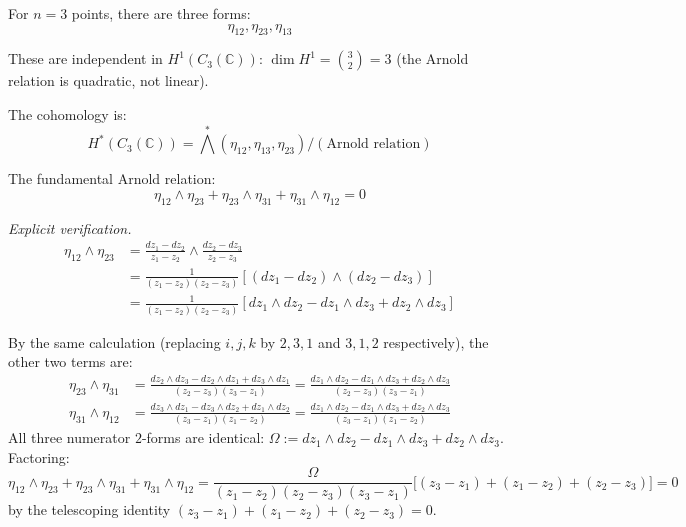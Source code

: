 \begin{example}[\texorpdfstring{$n=3$}{n=3}: the fundamental relation]
\label{ex:arnold-n3-complete}

For $n=3$ points, there are three forms:
\begin{equation}
\eta_{12}, \eta_{23}, \eta_{13}
\end{equation}

These are independent in $H^1(C_3(\mathbb{C}))$: $\dim H^1 = \binom{3}{2} = 3$
(the Arnold relation is quadratic, not linear).

The cohomology is:
\begin{equation}
H^*(C_3(\mathbb{C})) = \bigwedge^*(\eta_{12}, \eta_{13}, \eta_{23}) / (\text{Arnold relation})
\end{equation}

The fundamental Arnold relation:
\begin{equation}
\eta_{12} \wedge \eta_{23} + \eta_{23} \wedge \eta_{31} + \eta_{31}
\wedge \eta_{12} = 0
\end{equation}

\emph{Explicit verification.}
\begin{align}
\eta_{12} \wedge \eta_{23} &= \frac{dz_1 - dz_2}{z_1 - z_2} \wedge \frac{dz_2 -
dz_3}{z_2 - z_3}\\
&= \frac{1}{(z_1-z_2)(z_2-z_3)} [(dz_1 - dz_2) \wedge (dz_2 - dz_3)]\\
&= \frac{1}{(z_1-z_2)(z_2-z_3)} [dz_1 \wedge dz_2 - dz_1 \wedge dz_3 + dz_2 \wedge dz_3]
\end{align}

By the same calculation (replacing $i,j,k$ by $2,3,1$ and $3,1,2$ respectively), the other two terms are:
\begin{align}
\eta_{23} \wedge \eta_{31} &= \frac{dz_2 \wedge dz_3 - dz_2 \wedge dz_1 + dz_3 \wedge dz_1}{(z_2-z_3)(z_3-z_1)} = \frac{dz_1 \wedge dz_2 - dz_1 \wedge dz_3 + dz_2 \wedge dz_3}{(z_2-z_3)(z_3-z_1)}\\
\eta_{31} \wedge \eta_{12} &= \frac{dz_3 \wedge dz_1 - dz_3 \wedge dz_2 + dz_1 \wedge dz_2}{(z_3-z_1)(z_1-z_2)} = \frac{dz_1 \wedge dz_2 - dz_1 \wedge dz_3 + dz_2 \wedge dz_3}{(z_3-z_1)(z_1-z_2)}
\end{align}
All three numerator $2$-forms are identical: $\Omega := dz_1 \wedge dz_2 - dz_1 \wedge dz_3 + dz_2 \wedge dz_3$.  Factoring:
\begin{equation}
\eta_{12} \wedge \eta_{23} + \eta_{23} \wedge \eta_{31} + \eta_{31} \wedge \eta_{12} = \frac{\Omega}{(z_1{-}z_2)(z_2{-}z_3)(z_3{-}z_1)} \bigl[(z_3{-}z_1) + (z_1{-}z_2) + (z_2{-}z_3)\bigr] = 0
\end{equation}
by the telescoping identity $(z_3-z_1)+(z_1-z_2)+(z_2-z_3) = 0$.


\end{example}
